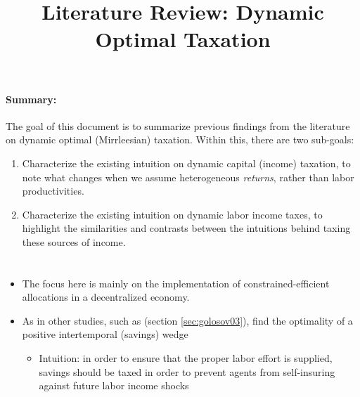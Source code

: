\documentclass[11pt]{article}
\title{Literature Review: Dynamic Optimal Taxation}
\author{}
\date{}
\begin{document}
    
\paragraph{Summary:} The goal of this document is to summarize previous findings from the literature on dynamic optimal (Mirrleesian) taxation. Within this, there are two sub-goals:
\begin{enumerate}
    \item Characterize the existing intuition on dynamic capital (income) taxation, to note what changes when we assume heterogeneous \textit{returns}, rather than labor productivities. 
    \item Characterize the existing intuition on dynamic labor income taxes, to highlight the similarities and contrasts between the intuitions behind taxing these sources of income. 
\end{enumerate}

\section{\cite{albanesi2006dynamic}}

\begin{itemize}
    \item The focus here is mainly on the implementation of constrained-efficient allocations in a decentralized economy. 
    \item As in other studies, such as \cite{golosov2003optimal} (section \ref{sec:golosov03}), \cite{albanesi2006dynamic} find the optimality of a positive intertemporal (savings) wedge 
    \begin{itemize}
        \item Intuition: in order to ensure that the proper labor effort is supplied, savings should be taxed in order to prevent agents from self-insuring against future labor income shocks
    \end{itemize}
\end{itemize}
\end{document}
